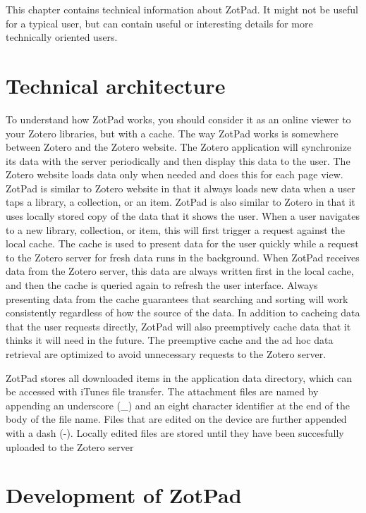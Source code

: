 \documentclass[oneside, openany, 12pt]{tufte-book}
\begin{document}
This chapter contains technical information about ZotPad. It might not be useful for a typical user, but can contain useful or interesting details for more technically oriented users. 

	\section{Technical architecture}
\label{sect:architecture}

To understand how ZotPad works, you should consider it as an online viewer to your Zotero libraries, but with a cache. The way ZotPad works is somewhere between Zotero and the Zotero website. The Zotero application will synchronize its data with the server periodically and then display this data to the user. The Zotero website loads data only when needed and does this for each page view. ZotPad is similar to Zotero website in that it always loads new data when a user taps a library, a collection, or an item. ZotPad is also similar to Zotero in that it uses locally stored copy of the data that it shows the user. When a user navigates to a new library, collection, or item, this will first trigger a request against the local cache. The cache is used to present data for the user quickly while a request to the Zotero server for fresh data runs in the background. When ZotPad receives data from the Zotero server, this data are always written first in the local cache, and then the cache is queried again to refresh the user interface. Always presenting data from the cache guarantees that searching and sorting will work consistently regardless of how the source of the data. In addition to cacheing data that the user requests directly, ZotPad will also preemptively cache data that it thinks it will need in the future. The preemptive cache and the ad hoc data retrieval are optimized to avoid unnecessary requests to the Zotero server. 

ZotPad stores all downloaded items in the application data directory, which can be accessed with iTunes file transfer. The attachment files are named by appending an underscore (\_) and an eight character identifier at the end of the body of the file name. Files that are edited on the device are further appended with a dash (-). Locally edited files are stored until they have been succesfully uploaded to the Zotero server

	\section{Development of ZotPad}
	
\end{document}
